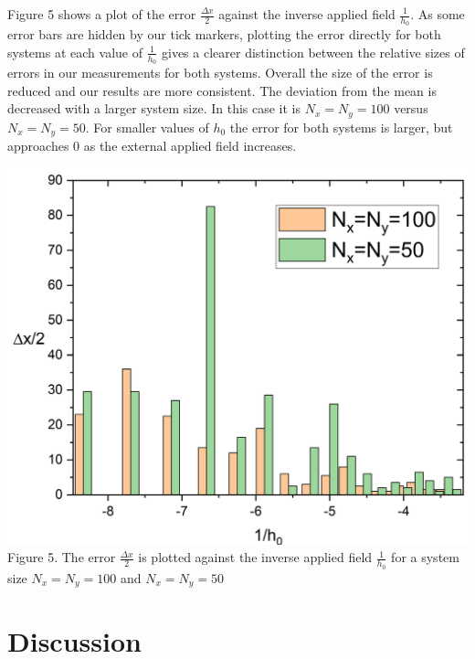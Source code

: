 \documentclass{article}
\begin{document}
\begin{multicols*}{2}
Figure 5 shows a plot of the error $\frac{\Delta x}{2}$ against the inverse applied field $\frac{1}{h_{0}}$. As some error bars are hidden by our tick markers, plotting the error directly for both systems at each value of $\frac{1}{h_{0}}$ gives a clearer distinction between the relative sizes of errors in our measurements for both systems. Overall the size of the error is reduced and our results are more consistent. The deviation from the mean is decreased with a larger system size. In this case it is $N_{x}=N_{y}=100$ versus $N_{x}=N_{y}=50$. For smaller values of $h_{0}$ the error for both systems is larger, but approaches 0 as the external applied field increases.
\newline
\newline
\begin{Figure}
\centering
\includegraphics[width=\linewidth]{errorgraph.jpg}
\footnotesize
Figure 5. The error $\frac{\Delta x}{2}$ is plotted against the inverse applied field $\frac{1}{h_{0}}$ for a system size $N_{x}=N_{y}=100$ and $N_{x}=N_{y}=50$
\end{Figure}
\normalsize
\maketitle
\section{Discussion}


\end{multicols*}
\end{document}
